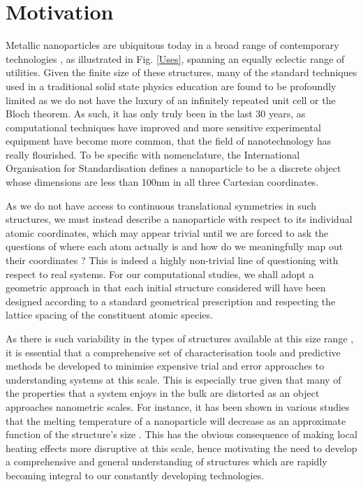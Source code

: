\section{Motivation}
\label{s:Mot}
Metallic nanoparticles are ubiquitous today in a broad range of contemporary technologies \cite{BioSensors,PlasmonSensing2021,SolarToChem}, as illustrated in Fig. \ref{Uses}, spanning an equally eclectic range of utilities. Given the finite size of these structures, many of the standard techniques used in a traditional solid state physics education are found to be profoundly limited as we do not have the luxury of an infinitely repeated unit cell or the Bloch theorem. As such, it has only truly been in the last 30 years, as computational techniques have improved and more sensitive experimental equipment have become more common, that the field of nanotechnology has really flourished. To be specific with nomenclature, the International Organisation for Standardisation defines a nanoparticle to be a discrete object whose dimensions are less than 100nm in all three Cartesian coordinates.

As we do not have access to continuous translational symmetries in such structures, we must instead describe a nanoparticle with respect to its individual atomic coordinates, which may appear trivial until we are forced to ask the questions of where each atom actually is and how do we meaningfully map out their coordinates \cite{Fra_Review}? This is indeed a highly non-trivial line of questioning with respect to real systems. For our computational studies, we shall adopt a geometric approach in that each initial structure considered will have been designed according to a standard geometrical prescription and respecting the lattice spacing of the constituent atomic species.

As there is such variability in the types of structures available at this size range \cite{Fra_Ricardo_Review}, it is essential that a comprehensive set of characterisation tools and predictive methods be developed to minimise expensive trial and error approaches to understanding systems at this scale. This is especially true given that many of the properties that a system enjoys in the bulk are distorted as an object approaches nanometric scales. For instance, it has been shown in various studies that the melting temperature of a nanoparticle will decrease as an approximate function of the structure's size \cite{LaiaMelt}. This has the obvious consequence of making local heating effects more disruptive at this scale, hence motivating the need to develop a comprehensive and general understanding of structures which are rapidly becoming integral to our constantly developing technologies.

